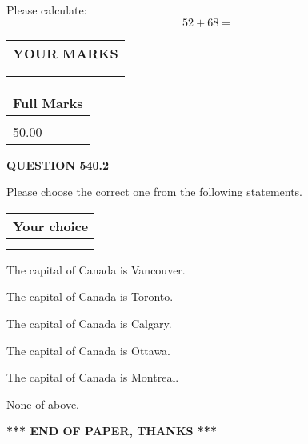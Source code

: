 \documentclass[12pt]{article}
\begin{document}
  
 
Please calculate:
\begin{equation}
52 +  %
68 = \nonumber
\end{equation}
 

 

 
  
\vspace{0.2in}
  
\noindent\begin{tabular}{|l|}
\hline
 YOUR MARKS  \\
\hline
 \\ 
 \\ 
\hline
\end{tabular}
\hspace{0.05in} \begin{tabular}{|l|}
\hline
 Full Marks  \\
\hline
 \\ 
50.00 \\
\hline
\end{tabular}
{\textbf{\Large{QUESTION
540.2 
}}}
  
  
Please choose the correct one from the following statements.
  
  
\noindent\hspace{3.0in} \begin{tabular}{|l|}
\hline
Your choice \\
\hline
 \\ 
 \\ 
\hline
\end{tabular}
  
  
 
 
The capital of Canada is Vancouver.
 
 
The capital of Canada is Toronto.
 
 
The capital of Canada is Calgary.
 
 
The capital of Canada is Ottawa.
 
 
The capital of Canada is Montreal.
 
 
 None of above.
 
 
   
   
 \vspace{0.2in}
 
   
   
   
   
\vspace{1.0in} 
{\textbf{\large{ *** END OF PAPER, THANKS *** }}} 
   
\end{document}
